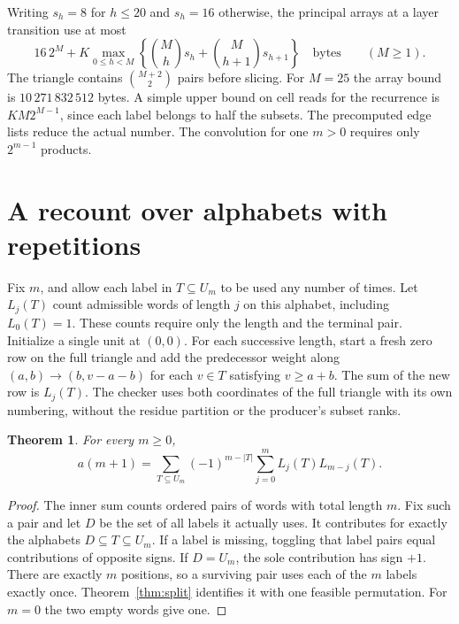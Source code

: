 \documentclass[11pt]{article}
\newtheorem{theorem}{Theorem}[section]
\begin{document}
Writing \(s_h=8\) for \(h\le20\) and \(s_h=16\) otherwise, the principal
arrays at a layer transition use at most
\[
 16\,2^M+K\max_{0\le h<M}
 \left\{\binom{M}{h}s_h+\binom{M}{h+1}s_{h+1}\right\}
 \quad\text{bytes}\qquad(M\ge1).
\]
The triangle contains \(\binom{M+2}{2}\) pairs before slicing.
For \(M=25\) the array bound is \(10\,271\,832\,512\) bytes. A simple upper bound
on cell reads for the recurrence is \(K M2^{M-1}\), since each label belongs
to half the subsets. The precomputed edge lists reduce the actual number.
The convolution for one \(m>0\) requires only \(2^{m-1}\) products.

\section{A recount over alphabets with repetitions}\label{sec:ie}

Fix \(m\), and allow each label in \(T\subseteq U_m\) to be used any
number of times. Let \(L_j(T)\) count admissible words of length \(j\)
on this alphabet, including \(L_0(T)=1\). These counts require only the
length and the terminal pair. Initialize a single unit at \((0,0)\).
For each successive length, start a fresh zero row on the full triangle
and add the predecessor weight along \((a,b)\to(b,v-a-b)\) for
each \(v\in T\) satisfying \(v\ge a+b\).
The sum of the new row is \(L_j(T)\). The checker uses both coordinates
of the full triangle with its own numbering, without the residue partition
or the producer's subset ranks.

\begin{theorem}\label{thm:ie}
For every \(m\ge0\),
\begin{equation}
 a(m+1)=\sum_{T\subseteq U_m}(-1)^{m-|T|}
             \sum_{j=0}^{m} L_j(T)L_{m-j}(T).
 \label{eq:ie}
\end{equation}
\end{theorem}
\begin{proof}
The inner sum counts ordered pairs of words with total length \(m\).
Fix such a pair and let \(D\) be the set of all labels it actually uses.
It contributes for exactly the alphabets \(D\subseteq T\subseteq U_m\).
If a label is missing, toggling that label pairs equal contributions
of opposite signs. If \(D=U_m\), the sole contribution has sign \(+1\).
There are exactly \(m\) positions, so a surviving pair uses each of the
\(m\) labels exactly once. Theorem~\ref{thm:split} identifies it with one
feasible permutation. For \(m=0\) the two empty words give one.
\end{proof}
\end{document}
